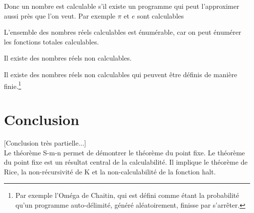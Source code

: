 \begin{myrem}
	Donc un nombre est calculable s'il existe un programme qui peut
	l'approximer aussi près que l'on veut. Par exemple $\pi$ et $e$ sont
	calculables
\end{myrem}

\begin{myprop}
	L'ensemble des nombres réels calculables est énumérable, car on peut énumérer les
	fonctions totales calculables.
\end{myprop}

\begin{myprop}
	Il existe des nombres réels non calculables.
\end{myprop}

\begin{myprop}
	Il existe des nombres réels non calculables qui peuvent être définis de
	manière finie.\footnote{Par exemple l'Oméga de Chaitin, qui est défini comme étant la probabilité qu’un programme auto-délimité, généré aléatoirement, finisse par s'arrêter.}
\end{myprop}


\section{Conclusion}
[Conclusion très partielle...]\\
Le théorème S-m-n permet de démontrer le théorème du point fixe.
Le théorème du point fixe est un résultat central de la calculabilité. Il
implique le théorème de Rice, la non-récursivité de K et la non-calculabilité
de la fonction halt.

